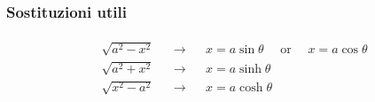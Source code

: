 \documentclass[letterpaper,10pt,italian]{jupyterBook}
\begin{document}
\subsubsection{Sostituzioni utili}
\label{\detokenize{ch/infinitesimal_calculus/integrals:sostituzioni-utili}}
\sphinxAtStartPar
{}
\begin{equation*}
\begin{split}\begin{aligned}
  & \sqrt{a^2 - x^2} && \rightarrow && x = a \sin  \theta \quad \text{ or } \quad x = a \cos \theta  \\
  & \sqrt{a^2 + x^2} && \rightarrow && x = a \sinh \theta \\
  & \sqrt{x^2 - a^2} && \rightarrow && x = a \cosh \theta \\
\end{aligned}\end{split}
\end{equation*}\label{ch/infinitesimal_calculus/integrals:integrals-methods-sub-1}
\end{document}
